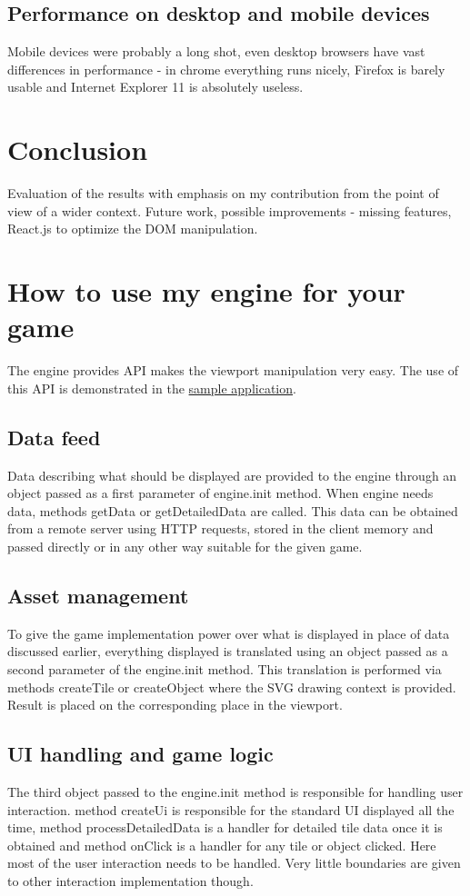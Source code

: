 \documentclass[11pt,oneside, final]{fithesis2}
\begin{document}
\section{Performance on desktop and mobile devices}
Mobile devices were probably a long shot, even desktop browsers have vast differences in performance - in chrome everything runs nicely, Firefox is barely usable and Internet Explorer 11 is absolutely useless.

\chapter{Conclusion}
Evaluation of the results with emphasis on my contribution from the point of view of a wider context.
Future work, possible improvements - missing features, React.js to optimize the DOM manipulation.


\appendix
\chapter{How to use my engine for your game}
The engine provides API makes the viewport manipulation very easy. The use of this API is demonstrated in the \href{https://github.com/vit-svoboda/svg-engine/tree/master/src/main/webapp/Scripts/game}{sample application}.

\section{Data feed}
Data describing what should be displayed are provided to the engine through an object passed as a first parameter of engine.init method. When engine needs data, methods getData or getDetailedData are called. This data can be obtained from a remote server using HTTP requests, stored in the client memory and passed directly or in any other way suitable for the given game.

\section{Asset management}
To give the game implementation power over what is displayed in place of data discussed earlier, everything displayed is translated using an object passed as a second parameter of the engine.init method. This translation is performed via methods createTile or createObject where the SVG drawing context is provided. Result is placed on the corresponding place in the viewport.

\section{UI handling and game logic}
The third object passed to the engine.init method is responsible for handling user interaction. method createUi is responsible for the standard UI displayed all the time, method processDetailedData is a handler for detailed tile data once it is obtained and method onClick is a handler for any tile or object clicked. Here most of the user interaction needs to be handled. Very little boundaries are given to other interaction implementation though.
\end{document}
